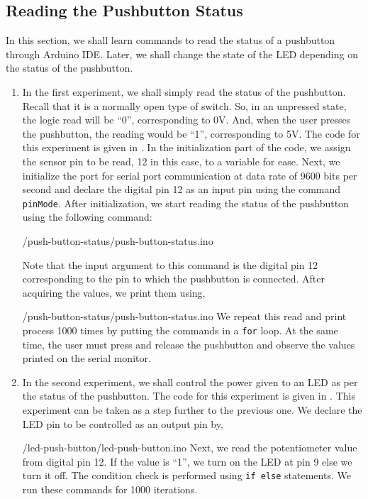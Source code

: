 \subsection{Reading the Pushbutton Status}
In this section, we shall learn commands to read the status of a
pushbutton through Arduino IDE. Later, we shall change the state of
the LED depending on the status of the pushbutton. 
\begin{enumerate}
\item In the first experiment, we shall simply read the status of the
  pushbutton. Recall that it is a normally open type of switch. So, in
  an unpressed state, the logic read will be ``0'', corresponding to
  0V. And, when the user presses the pushbutton, the reading would be
  ``1'', corresponding to 5V. The code for this experiment is given in
  . In the initialization part of the code, we
  assign the sensor pin to be read, 12 in this case, to a variable for
  ease. Next, we initialize the port for serial port communication at
  data rate of 9600 bits per second and declare the digital pin 12 as an input pin using the command {\tt pinMode}. After initialization, we start reading the status of the pushbutton using the following command:
  
  {\LocPushardcode/push-button-status/push-button-status.ino}

  Note that the input argument to this command is the digital pin 12
  corresponding to the pin to which the pushbutton is connected.  After
  acquiring the values, we print them using,
  
  {\LocPushardcode/push-button-status/push-button-status.ino} We
  repeat this read and print process 1000 times by putting the
  commands in a {\tt for} loop. At the same time, the user must press
  and release the pushbutton and observe the values printed on the
serial monitor.

\item In the second experiment, we shall control the power given to an
  LED as per the status of the pushbutton. The code for this
  experiment is given in . This experiment can be
  taken as a step further to the previous one. We declare the LED pin
  to be controlled as an output pin by,
  
  {\LocPushardcode/led-push-button/led-push-button.ino} Next, we read
  the potentiometer value from digital pin 12. If the value is ``1'',
  we turn on the LED at pin 9 else we turn it off. The
  condition check is performed using {\tt if else} statements. We run
  these commands for 1000 iterations.
\end{enumerate}

